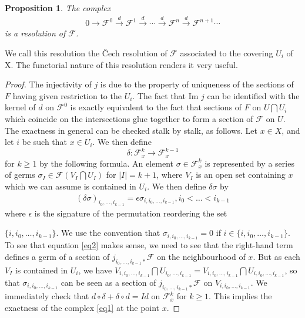 \documentclass{article}
\numberwithin{equation}{subsection} %
\newtheorem{prop}{Proposition}[section]
\theoremstyle{definition}
\begin{document}
\begin{prop}
	The complex
	\begin{align}
	\label{eq1}
		0 \to \mathcal F^0 \overset{d}{\to} \mathcal F^1 \overset{d}{\to} \cdots \overset{d}{\to} \mathcal F^n \overset{d}{\to} \mathcal F^{n+1} \cdots
	\end{align}
	is a resolution of $\mathcal F$.
\end{prop}
We call this resolution the \v{C}ech resolution of $\mathcal F$ associated to the covering $U_i$
of X. The functorial nature of this resolution renders it very useful.
\begin{proof} 
	The injectivity of $j$ is due to the property of uniqueness of the sections
	of $F$ having given restriction to the $U_i$. The fact that Im $j$ can be identified with
	the kernel of $d$ on $\mathcal F^0$ is exactly equivalent to the fact that sections of $F$ on
	$U \bigcap U_i$ which coincide on the intersections glue together to form a section of
	$\mathcal F$ on $U$. The exactness in general can be checked stalk by stalk, as follows. Let
	$x \in X$, and let $i$ be such that $x \in U_i$. We then define
	\[
	\delta : \mathcal F^k_x \to \mathcal F^{k-1}_x 
	\]
	for $k \ge 1$ by the following formula. An element $\sigma \in \mathcal F^k_x$ is represented by a
	series of germs $\sigma _I \in \mathcal F(V_I \bigcap U_I)$ for $|I|= k + 1$, where $V_I$ is an open set
	containing $x$ which we can assume is contained in $U_i$. We then define $\delta \sigma$ by
	\begin{align}
	\label{eq2}
	(\delta \sigma)_{i_0,\dots,i_{k-1}}=\epsilon \sigma_{i,i_0,\dots,i_{k-1}}, i_0<\dots<i_{k-1}
	\end{align}
	where $\epsilon$ is the signature of the permutation reordering
	the set 

	\noindent
	$\{i,i_0,\dots,i_{k-1}\}$.
	We use the convention that $\sigma_{i,i_0,\dots,i_{k-1}}=0$ if $i\in \{i,i_0,\dots,i_{k-1}\}$. To see that equation \ref{eq2} makes sense, we need to see that the right-hand term defines a germ of a section
	of $j_{i_0,\dots,i_{k-1}\ast}\mathcal F$ on the neighbourhood of $x$. But as each $V_I$ is contained in $U_i$,
	we have $V_{i,i_0,\dots,i_{k-1}}\bigcap U_{i_0,\dots,i_{k-1}}=V_{i,i_0,\dots,i_{k-1}}\bigcap U_{i,i_0,\dots,i_{k-1}}$, so that $\sigma_{i,i_0,\dots,i_{k-1}}$ can be seen as a section of $j_{i_0,\dots,i_{k-1}\ast}\mathcal F$ on $V_{i,i_0,\dots,i_{k-1}}$. We immediately check that
	$d\circ \delta + \delta \circ d=Id$ on $\mathcal F^k_x$ for $k \ge 1$. This implies the exactness of the complex
	\ref{eq1} at the point $x$.
\end{proof}
\end{document}
